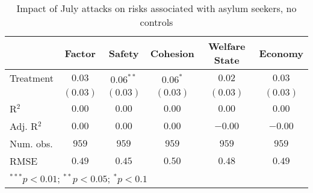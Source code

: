 
\begin{table}
\caption{Impact of July attacks on risks associated with asylum seekers, no controls}
\begin{center}
\begin{tabular}{l c c c c c}
\toprule
 & Factor & Safety & Cohesion & Welfare State & Economy \\
\midrule
Treatment  & $0.03$   & $0.06^{**}$ & $0.06^{*}$ & $0.02$   & $0.03$   \\
           & $(0.03)$ & $(0.03)$    & $(0.03)$   & $(0.03)$ & $(0.03)$ \\
\midrule
R$^2$      & $0.00$   & $0.00$      & $0.00$     & $0.00$   & $0.00$   \\
Adj. R$^2$ & $0.00$   & $0.00$      & $0.00$     & $-0.00$  & $-0.00$  \\
Num. obs.  & $959$    & $959$       & $959$      & $959$    & $959$    \\
RMSE       & $0.49$   & $0.45$      & $0.50$     & $0.48$   & $0.49$   \\
\bottomrule
\multicolumn{6}{l}{\scriptsize{$^{***}p<0.01$; $^{**}p<0.05$; $^{*}p<0.1$}}
\end{tabular}
\label{tab_risk_no_controls}
\end{center}
\end{table}

